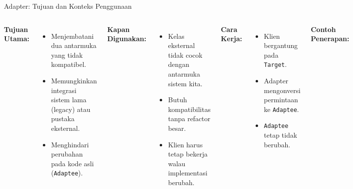 \documentclass[aspectratio=169, table]{beamer}
\begin{document}
\begin{frame}[fragile]{Adapter: Tujuan dan Konteks Penggunaan}
	\vspace{15pt}
	\begin{columns}[T]
		\textbf{Tujuan Utama:}
		\begin{itemize}
			\item Menjembatani dua antarmuka yang tidak kompatibel.
			\item Memungkinkan integrasi sistem lama (legacy) atau pustaka eksternal.
			\item Menghindari perubahan pada kode asli (\texttt{Adaptee}).
		\end{itemize}
		
		\textbf{Kapan Digunakan:}
		\begin{itemize}
			\item Kelas eksternal tidak cocok dengan antarmuka sistem kita.
			\item Butuh kompatibilitas tanpa refactor besar.
			\item Klien harus tetap bekerja walau implementasi berubah.
		\end{itemize}
		
		\textbf{Cara Kerja:}
		\begin{itemize}
			\item Klien bergantung pada \texttt{Target}.
			\item Adapter mengonversi permintaan ke \texttt{Adaptee}.
			\item \texttt{Adaptee} tetap tidak berubah.
		\end{itemize}
		
		\textbf{Contoh Penerapan:}
		\begin{itemize}
			\item Konversi data XML ke JSON melalui adapter.
			\item Integrasi komponen UI dari framework lama.
			\item USB-to-Serial adapter di perangkat keras.
		\end{itemize}
	\end{columns}
\end{frame}
\end{document}
